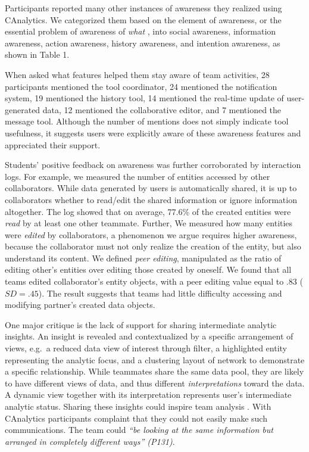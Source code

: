 Participants reported many other instances of awareness they realized
using CAnalytics. We categorized them based on the element of awareness,
or the essential problem of awareness of \emph{what}
\cite{Schmidt2002}, into social awareness, information awareness,
action awareness, history awareness, and intention awareness, as shown
in Table 1.

When asked what features helped them stay aware of team activities, 28
participants mentioned the tool coordinator, 24 mentioned the
notification system, 19 mentioned the history tool, 14 mentioned the
real-time update of user-generated data, 12 mentioned the collaborative
editor, and 7 mentioned the message tool. Although the number of mentions
does not simply indicate tool usefulness, it suggests users were explicitly aware of these awareness features and appreciated their support.


Students' positive feedback on awareness was further corroborated by
interaction logs. For example, we measured the number of entities
accessed by other collaborators. While data
generated by users is automatically shared, it is up to collaborators 
whether to read/edit the shared information or ignore information altogether.
The log showed that on average, 77.6\% of the created entities
were \emph{read} by at least one other teammate. Further, We measured how 
many entities were \emph{edited} by collaborators, a phenomenon we argue 
requires higher awareness, because the collaborator must not only realize 
the creation of the entity, but also understand its content. We 
defined \emph{peer editing}, manipulated as the ratio of editing other's 
entities over editing those created by oneself. We found that all teams 
edited collaborator's entity objects, with a peer editing value equal 
to .83 ($SD=.45$). The result suggests that teams had little difficulty 
accessing and modifying partner's created data objects.  

One major critique is the lack of support for sharing intermediate analytic
insights. An insight is revealed and contextualized by a specific arrangement of views, e.g.~a reduced data view of interest through filter, a highlighted entity representing the analytic focus, and a clustering layout of network to demonstrate a specific relationship. While teammates share the same data pool, they are likely to have different views of data, and thus different \emph{interpretations}
toward the data. A dynamic view together with its interpretation represents
user's intermediate analytic status. Sharing these insights could inspire team analysis \cite{Gotz2009d}. With CAnalytics
participants complaint that they could not easily make such communications. The team could \emph{``be
looking at the same information but arranged in completely different
ways'' (P131)}.

